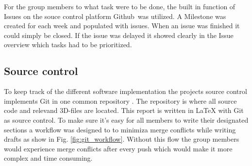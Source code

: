 For the group members to what task were to be done, the built in function of Issues on the souce control platform Github\textregistered \ was utilized. A Milestone was created for each week and populated with issues. When an issue was finished it could simply be closed. If the issue was delayed it showed clearly in the Issue overview which tasks had to be prioritized. 

\subsection{Source control}
To keep track of the different software implementation the projects source control implements Git in one common repository \cite{repo}. The repository is where all source code and relevand 3D-files are located. This report is written in LaTeX with Git as source control. To make sure it's easy for all members to write their designated sections a workflow was designed to to minimiza merge conflicts while writing drafts as show in Fig. \ref{fig:git_workflow}. Without this flow the group members would experience merge conflicts after every push which would make it more complex and time consuming.











